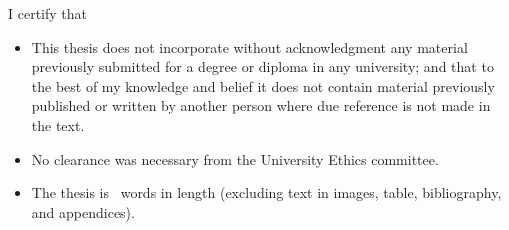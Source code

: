 I certify that

\begin{itemize}
    \item This thesis does not incorporate without acknowledgment any material
    previously submitted for a degree or diploma in any university; and that
    to the best of my knowledge and belief it does not contain
    material previously published or written by another person where due
    reference is not made in the text.
    \item No clearance was necessary from the University Ethics committee.
    \item The thesis is \wordcount\ words in length (excluding
    text in images, table, bibliography, and appendices).
\end{itemize}